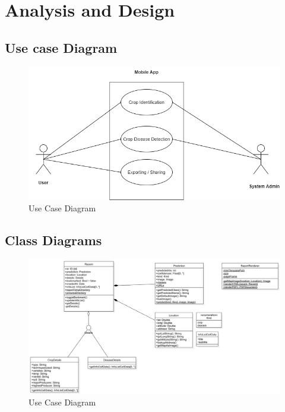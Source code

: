 \documentclass[../Report.tex]{subfiles}
\begin{document}
\chapter{Analysis and Design}

\section{Use case Diagram}
\begin{figure}[H]
    \includegraphics[width=0.8\linewidth]{images/usecase.png}
    \caption{Use Case Diagram}
    \label{fig:usecase}
\end{figure}

\section{Class Diagrams}
\begin{figure}[H]
    \includegraphics[width=0.8\linewidth]{images/class.png}
    \caption{Use Case Diagram}
    \label{fig:class}
\end{figure}
\end{document}
